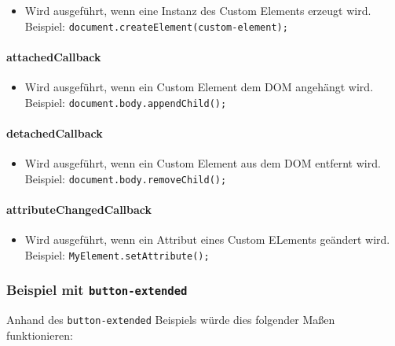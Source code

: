 \begin{itemize}
\tightlist
\item
  Wird ausgeführt, wenn eine Instanz des Custom Elements erzeugt wird.
  Beispiel:
  \texttt{document.createElement(\textquotesingle{}custom-element\textquotesingle{});}
\end{itemize}

\paragraph{attachedCallback}\label{attachedcallback}

\begin{itemize}
\tightlist
\item
  Wird ausgeführt, wenn ein Custom Element dem DOM angehängt wird.
  Beispiel: \texttt{document.body.appendChild();}
\end{itemize}

\paragraph{detachedCallback}\label{detachedcallback}

\begin{itemize}
\tightlist
\item
  Wird ausgeführt, wenn ein Custom Element aus dem DOM entfernt wird.
  Beispiel: \texttt{document.body.removeChild();}
\end{itemize}

\paragraph{attributeChangedCallback}\label{attributechangedcallback}

\begin{itemize}
\tightlist
\item
  Wird ausgeführt, wenn ein Attribut eines Custom ELements geändert
  wird. Beispiel: \texttt{MyElement.setAttribute();}
\end{itemize}

\subsubsection{\texorpdfstring{Beispiel mit
\texttt{button-extended}}{Beispiel mit button-extended}}\label{beispiel-mit-button-extended}

Anhand des \texttt{button-extended} Beispiels würde dies folgender Maßen
funktionieren:

